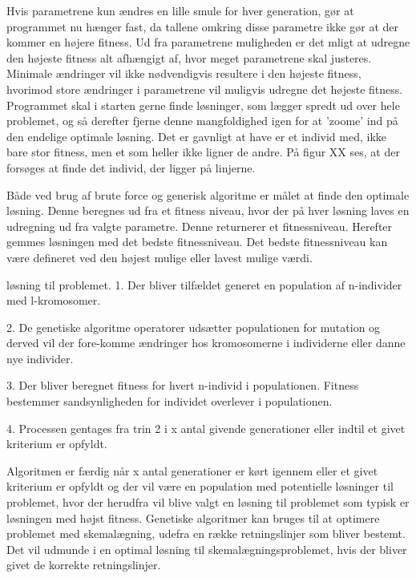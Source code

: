Hvis parametrene kun ændres en lille smule for hver generation, gør at programmet nu hænger fast, da tallene omkring disse parametre ikke gør at der kommer en højere fitness. Ud fra parametrene muligheden er det mligt at udregne den højeste fitness alt afhængigt af, hvor meget parametrene skal justeres. Minimale ændringer vil ikke nødvendigvis resultere i den højeste fitness, hvorimod store ændringer i parametrene vil muligvis udregne det højeste fitness. Programmet skal i starten gerne finde løsninger, som lægger spredt ud over hele problemet, og så derefter fjerne denne mangfoldighed igen for at ’zoome’ ind på den endelige optimale løsning. 
Det er gavnligt at have er et individ med, ikke bare stor fitness, men et som heller ikke ligner de andre. På figur XX%
 ses, at der forsøges at finde det individ, der ligger på linjerne.

Både ved brug af brute force og generisk algoritme er målet at finde den optimale løsning. Denne beregnes ud fra et fitness niveau, hvor der på hver løsning laves en udregning ud fra valgte parametre. Denne returnerer et fitnessniveau. Herefter gemmes løsningen med det bedste fitnessniveau. Det bedste fitnessniveau kan være defineret ved den højest mulige eller lavest mulige værdi.

løsning til problemet.
1.	Der bliver tilfældet generet en population af n-individer med l-kromosomer.

2.	De genetiske algoritme operatorer udsætter populationen for mutation og derved vil der fore-komme ændringer hos kromosomerne i individerne eller danne nye individer.

3.	Der bliver beregnet fitness for hvert n-individ i populationen. Fitness bestemmer sandsynligheden for individet overlever i populationen.

4.	Processen gentages fra trin 2 i x antal givende generationer eller indtil et givet kriterium er opfyldt.

Algoritmen er færdig når x antal generationer er kørt igennem eller et givet kriterium er opfyldt og der vil være en population med potentielle løsninger til problemet, hvor der herudfra vil blive valgt en løsning til problemet som typisk er løsningen med højst fitness. Genetiske algoritmer kan bruges til at optimere problemet med skemalægning, udefra en række retningslinjer som bliver bestemt. Det vil udmunde i en optimal løsning til skemalægningsproblemet, hvis der bliver givet de korrekte retningslinjer.

